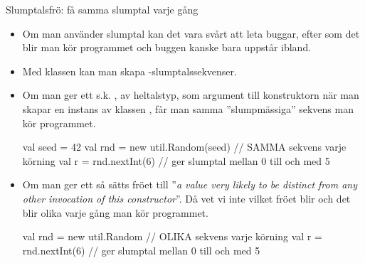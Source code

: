 \begin{Slide}{Slumptalsfrö: få samma slumptal varje gång}\SlideFontTiny
\begin{itemize}
\item Om man använder slumptal kan det vara svårt att leta buggar, efter som det blir  man kör programmet och buggen kanske bara uppstår ibland.

\item Med klassen  kan man skapa -slumptalssekvenser.
\pause
\item Om man ger ett s.k.  , av heltalstyp, som argument till konstruktorn när man skapar en instans av klassen , får man samma ''slumpmässiga'' sekvens  man kör programmet.

\begin{Code}
  val seed = 42
  val rnd = new util.Random(seed) // SAMMA sekvens varje körning
  val r = rnd.nextInt(6) // ger slumptal mellan 0 till och med 5
\end{Code}
\pause
\item Om man  ger ett  så sätts fröet till ''\emph{a value very likely to be distinct from any other invocation of this constructor}''. Då vet vi inte vilket fröet blir och det blir olika varje gång man kör programmet.
\begin{Code}
  val rnd = new util.Random // OLIKA sekvens varje körning
  val r = rnd.nextInt(6) // ger slumptal mellan 0 till och med 5
\end{Code}
\pause
\end{itemize}
\end{Slide}

%
%
%
%

